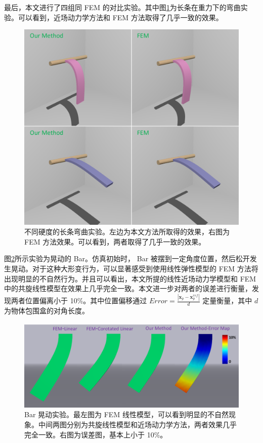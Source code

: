 最后，本文进行了四组同 FEM 的对比实验。其中图\ref{demo_strip_vs_fem}为长条在重力下的弯曲实验。可以看到，近场动力学方法和 FEM 方法取得了几乎一致的效果。

\begin{figure}[!htb]
  \centering
  \captionsetup{justification=centering}
  \includegraphics[width=0.7\linewidth]{chap/image/demo_strip_vs_fem}

  \caption{\label{demo_strip_vs_fem}
           不同硬度的长条弯曲实验。左边为本文方法所取得的效果，右图为 FEM 方法效果。可以看到，两者取得了几乎一致的效果。
          }
\end{figure}

图\ref{demo_bar_oscillate_vs_fem}所示实验为晃动的 Bar。仿真初始时， Bar 被摆到一定角度位置，然后松开发生晃动。对于这种大形变行为，可以显著感受到使用线性弹性模型的 FEM 方法将出现明显的不自然行为。并且可以看出，本文所提的线性近场动力学模型和 FEM 中的共旋线性模型在效果上几乎完全一致。本文进一步对两者的误差进行衡量，发现两者位置偏离小于 10\%。其中位置偏移通过 $Error = \frac{|\bm{x}_p-\bm{x}_p^{ref}|}{d}$ 定量衡量，其中 $d$ 为物体包围盒的对角长度。

\begin{figure}[!htb]
  \centering
  \captionsetup{justification=centering}
  \includegraphics[width=0.9\linewidth]{chap/image/demo_bar_oscillate_vs_fem}

  \caption{\label{demo_bar_oscillate_vs_fem}
           Bar 晃动实验。最左图为 FEM 线性模型，可以看到明显的不自然现象。中间两图分别为共旋线性模型和近场动力学方法，两者效果几乎完全一致。右图为误差图，基本上小于 10\%。
          }
\end{figure}

